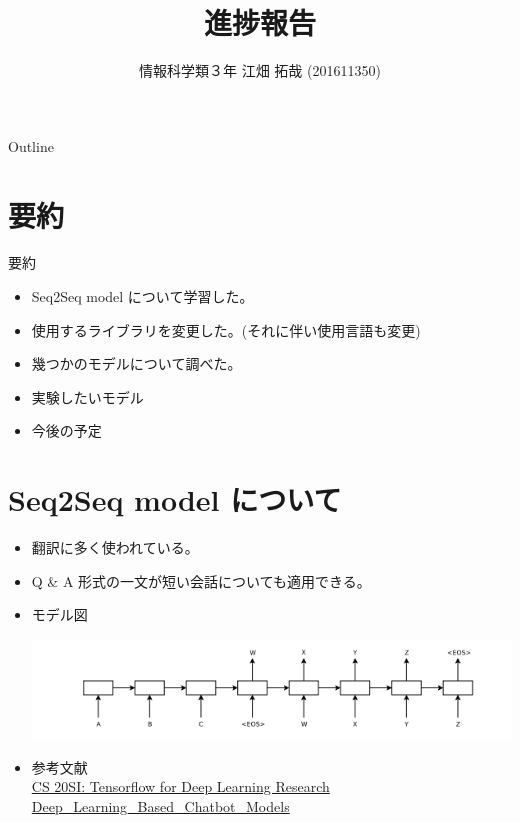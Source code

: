 \documentclass[dvipdfmx,10pt,presentation]{beamer}
\author{情報科学類３年 江畑 拓哉 (201611350)}
\date{}
\title{進捗報告}
\begin{document}
\maketitle
\begin{frame}{Outline}
\tableofcontents
\end{frame}

\section{要約}
\label{sec:orgbf22f9e}
\begin{frame}[allowframebreaks]{要約}
\begin{itemize}
\item Seq2Seq model について学習した。\\
\item 使用するライブラリを変更した。(それに伴い使用言語も変更)\\
\item 幾つかのモデルについて調べた。\\
\item 実験したいモデル\\
\item 今後の予定\\
\end{itemize}
\end{frame}

\section{Seq2Seq model について}
\label{sec:orgfa85d80}
\begin{frame}[allowframebreaks]{}
\begin{itemize}
\item 翻訳に多く使われている。\\
\item Q \& A 形式の一文が短い会話についても適用できる。\\
\item モデル図\\
\begin{center}
\includegraphics[width=.9\linewidth]{./seq2seq.png}
\end{center}
\item 参考文献\\
\href{https://web.stanford.edu/class/cs20si/2017/}{CS 20SI: Tensorflow for Deep Learning Research}\\
\href{https://www.researchgate.net/publication/323587007\_Deep\_Learning\_Based\_Chatbot\_Models}{Deep\_Learning\_Based\_Chatbot\_Models}\\
\end{itemize}
\end{frame}
\end{document}
